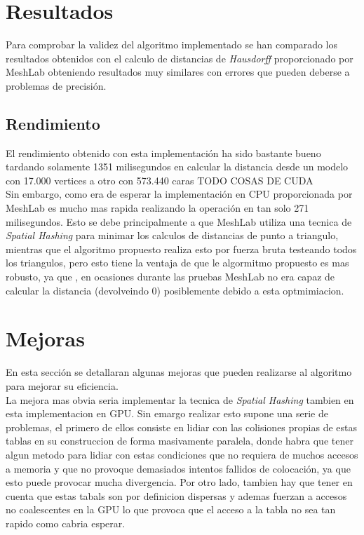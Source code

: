 \documentclass[10pt,oneside,a4paper]{article}
\begin{document}
\section{Resultados}
Para comprobar la validez del algoritmo implementado se han comparado los resultados obtenidos con el calculo de distancias de \textit{Hausdorff} proporcionado por MeshLab obteniendo resultados muy similares con errores que pueden deberse a problemas de precisión.
\subsection{Rendimiento}
El rendimiento obtenido con esta implementación ha sido bastante bueno tardando solamente 1351 milisegundos en calcular la distancia desde un modelo con 17.000 vertices  a otro con 573.440 caras TODO COSAS DE CUDA\\

Sin embargo, como era de esperar la implementación en CPU proporcionada por MeshLab es mucho mas rapida realizando la operación en tan solo 271 milisegundos. Esto se debe principalmente a que MeshLab utiliza una tecnica de \textit{Spatial Hashing} para minimar los calculos de distancias de punto a triangulo, mientras que el algoritmo propuesto realiza esto por fuerza bruta testeando todos los triangulos, pero esto tiene la ventaja de que le algormitmo propuesto es mas robusto, ya que , en ocasiones durante las pruebas MeshLab no era capaz de calcular la distancia (devolveindo 0) posiblemente debido a esta optmimiacion.

\section{Mejoras}
En esta sección se detallaran algunas mejoras que pueden realizarse al algoritmo para mejorar su eficiencia.\\

La mejora mas obvia seria implementar la tecnica de \textit{Spatial Hashing} tambien en esta implementacion en GPU. Sin emargo realizar esto supone una serie de problemas, el primero de ellos consiste en lidiar con las colisiones propias de estas tablas en su construccion de forma masivamente paralela, donde habra que tener algun metodo para lidiar con estas condiciones que no requiera de muchos accesos a memoria y que no provoque demasiados intentos fallidos de colocación, ya que esto puede provocar mucha divergencia. Por otro lado, tambien hay que tener en cuenta que estas tabals son por definicion dispersas y ademas fuerzan a accesos no coalescentes en la GPU lo que provoca que el acceso a la tabla no sea tan rapido como cabria esperar.
\end{document}

